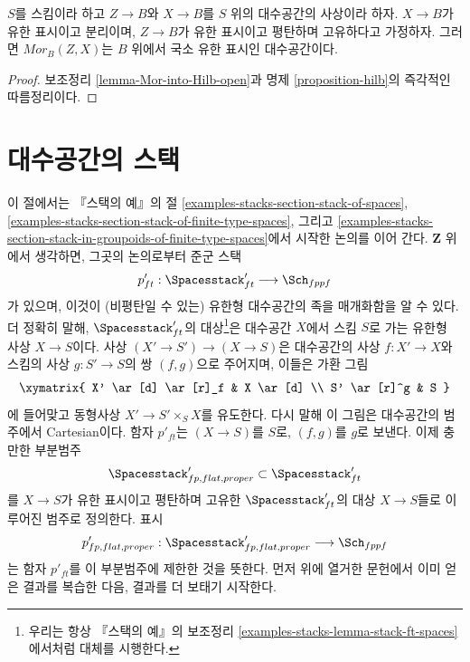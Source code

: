 \begin{proposition}
\label{proposition-Mor}
$S$를 스킴이라 하고 $Z \to B$와 $X \to B$를 $S$ 위의 대수공간의
사상이라 하자. $X \to B$가 유한 표시이고 분리이며,
$Z \to B$가 유한 표시이고 평탄하며 고유하다고 가정하자.
그러면 $\mathit{Mor}_B(Z, X)$는 $B$ 위에서 국소 유한 표시인 대수공간이다.
\end{proposition}

\begin{proof}
보조정리 \ref{lemma-Mor-into-Hilb-open}과 명제
\ref{proposition-hilb}의 즉각적인 따름정리이다.
\end{proof}








\section{대수공간의 스택}
\label{section-stack-of-spaces}

\noindent
이 절에서는 『스택의 예』의 절
\ref{examples-stacks-section-stack-of-spaces},
\ref{examples-stacks-section-stack-of-finite-type-spaces}, 그리고
\ref{examples-stacks-section-stack-in-groupoids-of-finite-type-spaces}에서
시작한 논의를 이어 간다. $\mathbf{Z}$ 위에서 생각하면, 그곳의 논의로부터
준군 스택
$$
p'_{ft} : \Spacesstack'_{ft} \longrightarrow \Sch_{fppf}
$$
가 있으며, 이것이 (비평탄일 수 있는) 유한형 대수공간의 족을 매개화함을
알 수 있다. 더 정확히 말해, $\Spacesstack'_{ft}$의 대상\footnote{우리는 항상
『스택의 예』의 보조정리 \ref{examples-stacks-lemma-stack-ft-spaces}에서처럼
대체를 시행한다.}은 대수공간 $X$에서 스킴 $S$로 가는 유한형 사상
$X \to S$이다. 사상 $(X' \to S') \to (X \to S)$은 대수공간의 사상
$f : X' \to X$와 스킴의 사상 $g : S' \to S$의 쌍 $(f, g)$으로 주어지며,
이들은 가환 그림
$$
\xymatrix{
X' \ar[d] \ar[r]_f & X \ar[d] \\
S' \ar[r]^g & S
}
$$
에 들어맞고 동형사상 $X' \to S' \times_S X$를 유도한다. 다시 말해 이
그림은 대수공간의 범주에서 Cartesian이다. 함자 $p'_{ft}$는
$(X \to S)$를 $S$로, $(f, g)$를 $g$로 보낸다. 이제 충만한 부분범주
$$
\Spacesstack'_{fp, flat, proper} \subset
\Spacesstack'_{ft}
$$
를 $X \to S$가 유한 표시이고 평탄하며 고유한 $\Spacesstack'_{ft}$의
대상 $X \to S$들로 이루어진 범주로 정의한다. 표시
$$
p'_{fp, flat, proper} :
\Spacesstack'_{fp, flat, proper}
\longrightarrow
\Sch_{fppf}
$$
는 함자 $p'_{ft}$를 이 부분범주에 제한한 것을 뜻한다. 먼저 위에 열거한
문헌에서 이미 얻은 결과를 복습한 다음, 결과를 더 보태기 시작한다.

